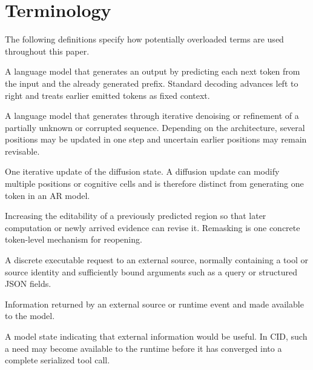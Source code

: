\section{Terminology}
\label{app:terminology}

The following definitions specify how potentially overloaded terms are used throughout this paper.

\begin{description}[leftmargin=0pt,labelindent=0pt,itemsep=2pt,topsep=3pt]
  \item[Autoregressive language model (AR LM).]
  A language model that generates an output by predicting each next token from the input and the already generated prefix. Standard decoding advances left to right and treats earlier emitted tokens as fixed context.

  \item[Diffusion language model (dLLM).]
  A language model that generates through iterative denoising or refinement of a partially unknown or corrupted sequence. Depending on the architecture, several positions may be updated in one step and uncertain earlier positions may remain revisable.

  \item[Denoising step / diffusion update.]
  One iterative update of the diffusion state. A diffusion update can modify multiple positions or cognitive cells and is therefore distinct from generating one token in an AR model.

  \item[Reopening / remasking.]
  Increasing the editability of a previously predicted region so that later computation or newly arrived evidence can revise it. Remasking is one concrete token-level mechanism for reopening.

  \item[Tool call.]
  A discrete executable request to an external source, normally containing a tool or source identity and sufficiently bound arguments such as a query or structured JSON fields.

  \item[Observation.]
  Information returned by an external source or runtime event and made available to the model.

  \item[Information need.]
  A model state indicating that external information would be useful. In CID, such a need may become available to the runtime before it has converged into a complete serialized tool call.


\end{description}
